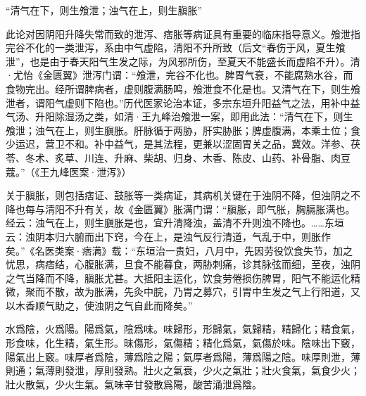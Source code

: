 \documentclass[12pt]{ctexbook}
\begin{document}

“清气在下，则生飧泄；浊气在上，则生䐜胀”

此论对因阴阳升降失常而致的泄泻、痞胀等病证具有重要的临床指导意义。飧泄指完谷不化的一类泄泻，系由中气虚陷，清阳不升所致（后文“春伤于风，夏生飧泄”，也是由于春天阳气生发之际，为风邪所伤，至夏天不能盛长而虚陷不升）。清·尤怡《金匮翼》泄泻门谓：“飧泄，完谷不化也。脾胃气衰，不能腐熟水谷，而食物完出。经所谓脾病者，虚则腹满肠鸣，飧泄食不化是也。又清气在下，则生飧泄者，谓阳气虚则下陷也。”历代医家论治本证，多宗东垣升阳益气之法，用补中益气汤、升阳除湿汤之类，如清·王九峰治飧泄一案，即用此法：“清气在下，则生飧泄；浊气在上，则生䐜胀。肝脉循于两胁，肝实胁胀；脾虚腹满，本乘土位；食少运迟，营卫不和。补中益气，是其法程，更兼以涩固胃关之品，冀效。洋参、茯苓、冬术、炙草、川连、升麻、柴胡、归身、木香、陈皮、山药、补骨脂、肉豆蔻。”（《王九峰医案·泄泻》）

关于䐜胀，则包括痞证、鼓胀等一类病证，其病机关键在于浊阴不降，但浊阴之不降也每与清阳不升有关，故《金匮翼》胀满门谓：“䐜胀，即气胀，胸膈胀满也。经云：浊气在上，则生䐜胀是也，宜升清降浊，盖清不升则浊不降也。……东垣云：浊阴本归六腑而出下窍，今在上，是浊气反行清道，气乱于中，则胀作矣。”《名医类案·痞满》载：“东垣治一贵妇，八月中，先因劳役饮食失节，加之忧思，病痞结，心腹胀满，旦食不能暮食，两胁刺痛，诊其脉弦而细，至夜，浊阴之气当降而不降，䐜胀尤甚。大抵阳主运化，饮食劳倦损伤脾胃，阳气不能运化精微，聚而不散，故为胀满，先灸中脘，乃胃之募穴，引胃中生发之气上行阳道，又以木香顺气助之，使浊阴之气自此而降矣。”


\begin{yuanwen}
水爲陰，火爲陽。陽爲氣，陰爲味。味歸形，形歸氣，氣歸精，精歸化；精食氣，形食味，化生精，氣生形。昧傷形，氣傷精；精化爲氣，氣傷於味。陰味出下竅，陽氣出上竅。味厚者爲陰，薄爲陰之陽；氣厚者爲陽，薄爲陽之陰。味厚則泄，薄則通；氣薄則發泄，厚則發熟。壯火之氣衰，少火之氣壯；壯火食氣，氣食少火；壯火散氣，少火生氣。氣味辛甘發散爲陽，酸苦涌泄爲陰。
\end{yuanwen}

\end{document}
